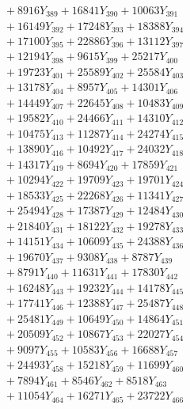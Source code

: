 \documentclass[a4paper,10pt]{article}
\begin{document}
{\begin{align}
&\;  + 8916 Y_{389} + 16841 Y_{390} + 10063 Y_{391} \\[0.3ex]
&\;  + 16149 Y_{392} + 17248 Y_{393} + 18388 Y_{394} \\[0.3ex]
&\;  + 17100 Y_{395} + 22886 Y_{396} + 13112 Y_{397} \\[0.3ex]
&\;  + 12194 Y_{398} + 9615 Y_{399} + 25217 Y_{400} \\[0.3ex]
&\;  + 19723 Y_{401} + 25589 Y_{402} + 25584 Y_{403} \\[0.3ex]
&\;  + 13178 Y_{404} + 8957 Y_{405} + 14301 Y_{406} \\[0.3ex]
&\;  + 14449 Y_{407} + 22645 Y_{408} + 10483 Y_{409} \\[0.3ex]
&\;  + 19582 Y_{410} + 24466 Y_{411} + 14310 Y_{412} \\[0.3ex]
&\;  + 10475 Y_{413} + 11287 Y_{414} + 24274 Y_{415} \\[0.3ex]
&\;  + 13890 Y_{416} + 10492 Y_{417} + 24032 Y_{418} \\[0.5ex]\allowbreak
&\;  + 14317 Y_{419} + 8694 Y_{420} + 17859 Y_{421} \\[0.3ex]
&\;  + 10294 Y_{422} + 19709 Y_{423} + 19701 Y_{424} \\[0.3ex]
&\;  + 18533 Y_{425} + 22268 Y_{426} + 11341 Y_{427} \\[0.3ex]
&\;  + 25494 Y_{428} + 17387 Y_{429} + 12484 Y_{430} \\[0.3ex]
&\;  + 21840 Y_{431} + 18122 Y_{432} + 19278 Y_{433} \\[0.3ex]
&\;  + 14151 Y_{434} + 10609 Y_{435} + 24388 Y_{436} \\[0.3ex]
&\;  + 19670 Y_{437} + 9308 Y_{438} + 8787 Y_{439} \\[0.3ex]
&\;  + 8791 Y_{440} + 11631 Y_{441} + 17830 Y_{442} \\[0.3ex]
&\;  + 16248 Y_{443} + 19232 Y_{444} + 14178 Y_{445} \\[0.3ex]
&\;  + 17741 Y_{446} + 12388 Y_{447} + 25487 Y_{448} \\[0.5ex]\allowbreak
&\;  + 25481 Y_{449} + 10649 Y_{450} + 14864 Y_{451} \\[0.3ex]
&\;  + 20509 Y_{452} + 10867 Y_{453} + 22027 Y_{454} \\[0.3ex]
&\;  + 9097 Y_{455} + 10583 Y_{456} + 16688 Y_{457} \\[0.3ex]
&\;  + 24493 Y_{458} + 15218 Y_{459} + 11699 Y_{460} \\[0.3ex]
&\;  + 7894 Y_{461} + 8546 Y_{462} + 8518 Y_{463} \\[0.3ex]
&\;  + 11054 Y_{464} + 16271 Y_{465} + 23722 Y_{466} \\[0.3ex]

\end{align}}
\end{document}
